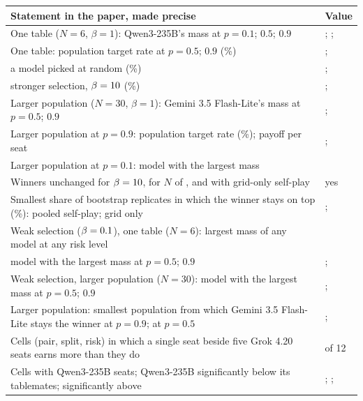 \documentclass[10pt]{article}
\makeatletter
\newenvironment{claims}{\small\begin{tabular}{@{}>{\raggedright\arraybackslash}p{0.74\textwidth}>{\raggedleft\arraybackslash}p{0.2\textwidth}@{}}\toprule Statement in the paper, made precise & Value \\\midrule}{\bottomrule\end{tabular}}
\makeatother
\begin{document}
\begin{center}
\begin{claims}
One table ($N=6$, $\beta=1$): Qwen3-235B's mass at $p=0.1$; $0.5$; $0.9$ & \SelWithinQwenMassLow{}; \SelWithinQwenMassMid{}; \SelWithinQwenMassHigh{} \\
One table: population target rate at $p=0.5$; $0.9$ (\%) & \SelWithinReachMid{}; \SelWithinReachHigh{} \\
\quad a model picked at random (\%) & \SelUniformReachMid{}; \SelUniformReachHigh{} \\
\quad stronger selection, $\beta=10$ (\%) & \SelStrongWithinReachMid{}; \SelStrongWithinReachHigh{} \\
Larger population ($N=30$, $\beta=1$): Gemini 3.5 Flash-Lite's mass at $p=0.5$; $0.9$ & \SelAcrossFlashMassMid{}; \SelAcrossFlashMassHigh{} \\
Larger population at $p=0.9$: population target rate (\%); payoff per seat & \SelAcrossReachHigh{}; \SelAcrossPayHigh{} \\
Larger population at $p=0.1$: model with the largest mass & \SelAcrossWinnerLow{} \\
Winners unchanged for $\beta=10$, for $N$ of \SelNExtra{}, and with grid-only self-play & yes \\
Smallest share of bootstrap replicates in which the winner stays on top (\%): pooled self-play; grid only & \SelBootMinPct{}; \SupSelBaseBootMinPct{} \\
Weak selection ($\beta=0.1$), one table ($N=6$): largest mass of any model at any risk level & \SelWeakWithinMaxMass{} \\
\quad model with the largest mass at $p=0.5$; $0.9$ & \SupSelWeakWithinTopMid{}; \SupSelWeakWithinTopHigh{} \\
Weak selection, larger population ($N=30$): model with the largest mass at $p=0.5$; $0.9$ & \SelWeakAcrossTopMid{}; \SelWeakAcrossTopHigh{} \\
Larger population: smallest population from which Gemini 3.5 Flash-Lite stays the winner at $p=0.9$; at $p=0.5$ & \SelSwitchN{}; \SupSelSwitchNMid{} \\
Cells (pair, split, risk) in which a single seat beside five Grok 4.20 seats earns more than they do & \SelGrokLosesCells{} of 12 \\
Cells with Qwen3-235B seats; Qwen3-235B significantly below its tablemates; significantly above & \SelQwenCells{}; \SelQwenBelowCells{}; \SelQwenAboveCells{} \\
\end{claims}
\end{center}
\end{document}
